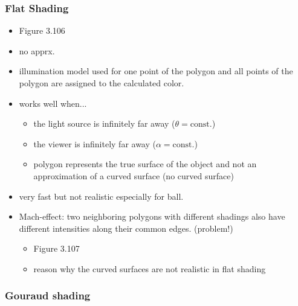 \documentclass{standalone}
\begin{document}
\subsubsection*{Flat Shading}

\begin{itemize}
	\item Figure 3.106
	\item no apprx.
	\item illumination model used for one point of the polygon and all points of the polygon are assigned to the calculated color. 
	\item works well when...
		\begin{itemize}
			\item the light source is infinitely far away ($\theta = \text{const.}$)
			\item the viewer is infinitely far away ($\alpha = \text{const.}$)
			\item polygon represents the true surface of the object and not an approximation of a curved surface (no curved surface)
		\end{itemize}
	\item very fast but not realistic especially for ball.
	\item Mach-effect: two neighboring polygons with different shadings also have different intensities along their common edges. (problem!)
		\begin{itemize}
			\item Figure 3.107
			\item reason why the curved surfaces are not realistic in flat shading
		\end{itemize}
\end{itemize}


\subsubsection*{Gouraud shading}
\end{document}
